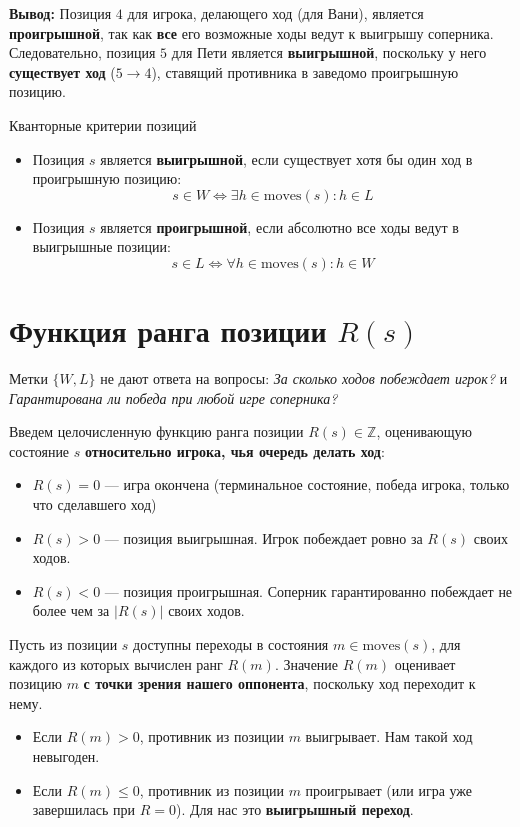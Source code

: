\documentclass[11pt,a4paper]{article}
\begin{document}
\textbf{Вывод:} Позиция $4$ для игрока, делающего ход (для Вани), является \textbf{проигрышной}, так как \textbf{все} его возможные ходы ведут к выигрышу соперника. Следовательно, позиция $5$ для Пети является \textbf{выигрышной}, поскольку у него \textbf{существует ход} ($5 \to 4$), ставящий противника в заведомо проигрышную позицию.

\begin{definitionbox}{Кванторные критерии позиций}
\begin{itemize}
    \item Позиция $s$ является \textbf{выигрышной}, если существует хотя бы один ход в проигрышную позицию:
    $$s \in W \iff \exists h \in \text{moves}(s) : h \in L$$
    \item Позиция $s$ является \textbf{проигрышной}, если абсолютно все ходы ведут в выигрышные позиции:
    $$s \in L \iff \forall h \in \text{moves}(s) : h \in W$$
\end{itemize}
\end{definitionbox}

\section{Функция ранга позиции $R(s)$}

Метки $\{W, L\}$ не дают ответа на вопросы: \textit{\guillemotleft За сколько ходов побеждает игрок?\guillemotright} и \textit{\guillemotleft Гарантирована ли победа при любой игре соперника?\guillemotright}

Введем целочисленную функцию ранга позиции $R(s) \in \mathbb{Z}$, оценивающую состояние $s$ \textbf{относительно игрока, чья очередь делать ход}:
\begin{itemize}
    \item $R(s) = 0$ --- игра окончена (терминальное состояние, победа игрока, только что сделавшего ход)
    \item $R(s) > 0$ --- позиция выигрышная. Игрок побеждает ровно за $R(s)$ своих ходов.
    \item $R(s) < 0$ --- позиция проигрышная. Соперник гарантированно побеждает не более чем за $|R(s)|$ своих ходов.
\end{itemize}

Пусть из позиции $s$ доступны переходы в состояния $m \in \text{moves}(s)$, для каждого из которых вычислен ранг $R(m)$.  
Значение $R(m)$ оценивает позицию $m$ \textbf{с точки зрения нашего оппонента}, поскольку ход переходит к нему.
\begin{itemize}
    \item Если $R(m) > 0$, противник из позиции $m$ выигрывает. Нам такой ход невыгоден.
    \item Если $R(m) \le 0$, противник из позиции $m$ проигрывает (или игра уже завершилась при $R=0$). Для нас это \textbf{выигрышный переход}.
\end{itemize}
\end{document}

